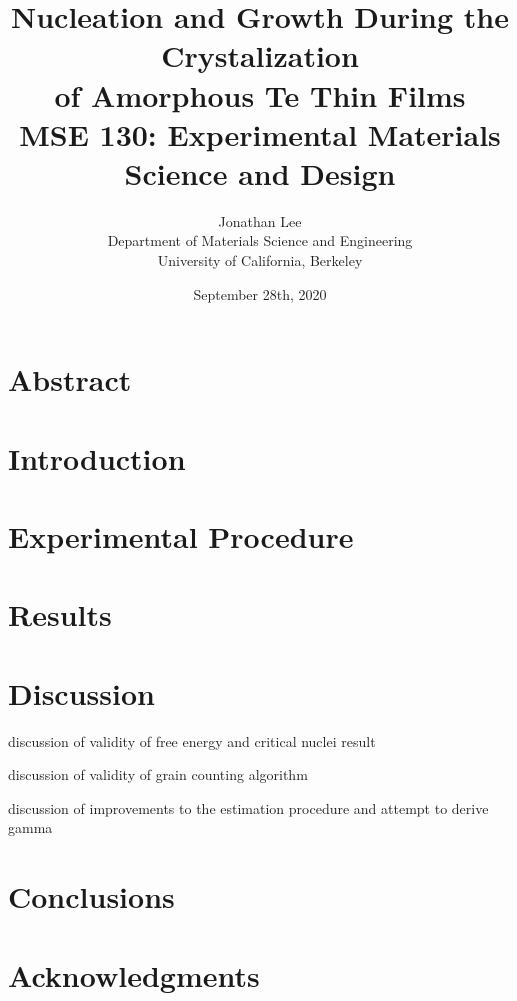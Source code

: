 \documentclass[12pt, titlepage]{article}
\title{\Large Nucleation and Growth During the Crystalization \\
		of Amorphous Te Thin Films \\
		\bigskip
	\normalsize MSE 130: Experimental Materials Science and Design}
\author{\normalsize Jonathan Lee \\
	\normalsize Department of Materials Science and Engineering \\
	\normalsize University of California, Berkeley}
\date{\normalsize September 28th, 2020}
\begin{document}
\maketitle

\doublespacing

\setcounter{page}{2}

\tableofcontents

\newpage

\section{Abstract}

\section{Introduction}



\section{Experimental Procedure}



\section{Results}



\section{Discussion}

discussion of validity of free energy and critical nuclei result

discussion of validity of grain counting algorithm

discussion of improvements to the estimation procedure and attempt to derive gamma



\section{Conclusions}

\section{Acknowledgments}

\printbibliography[heading=bibnumbered]
\end{document}
